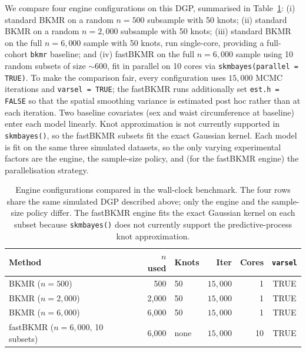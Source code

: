 \documentclass[11pt]{article}
\newcommand{\pkg}[1]{\texttt{#1}}
\newcommand{\code}[1]{\texttt{#1}}
\begin{document}
We compare four engine configurations on this DGP, summarised in Table~\ref{tab:fastbkmr_config}: (i) standard BKMR on a random $n = 500$ subsample with 50 knots; (ii) standard BKMR on a random $n = 2{,}000$ subsample with 50 knots; (iii) standard BKMR on the full $n = 6{,}000$ sample with 50 knots, run single-core, providing a full-cohort \pkg{bkmr} baseline; and (iv) fastBKMR on the full $n = 6{,}000$ sample using 10 random subsets of size $\sim 600$, fit in parallel on 10 cores via \code{skmbayes(parallel = TRUE)}. To make the comparison fair, every configuration uses $15{,}000$ MCMC iterations and \code{varsel = TRUE}; the fastBKMR runs additionally set \code{est.h = FALSE} so that the spatial smoothing variance is estimated post hoc rather than at each iteration. Two baseline covariates (sex and waist circumference at baseline) enter each model linearly. Knot approximation is not currently supported in \code{skmbayes()}, so the fastBKMR subsets fit the exact Gaussian kernel. Each model is fit on the same three simulated datasets, so the only varying experimental factors are the engine, the sample-size policy, and (for the fastBKMR engine) the parallelisation strategy.

\begin{table}[h]
\centering
\setlength{\tabcolsep}{6pt}
\caption{Engine configurations compared in the wall-clock benchmark. The four rows share the same simulated DGP described above; only the engine and the sample-size policy differ. The fastBKMR engine fits the exact Gaussian kernel on each subset because \code{skmbayes()} does not currently support the predictive-process knot approximation.}
\label{tab:fastbkmr_config}
\begin{tabular}{lrlrrc}
\toprule
Method & $n$ used & Knots & Iter & Cores & \code{varsel} \\
\midrule
BKMR ($n = 500$)     &   500 & 50   & $15{,}000$ &  1 & TRUE \\
BKMR ($n = 2{,}000$) & 2{,}000 & 50   & $15{,}000$ &  1 & TRUE \\
BKMR ($n = 6{,}000$) & 6{,}000 & 50   & $15{,}000$ &  1 & TRUE \\
fastBKMR ($n = 6{,}000$, 10 subsets) & 6{,}000 & none & $15{,}000$ & 10 & TRUE \\
\bottomrule
\end{tabular}
\end{table}
\end{document}
